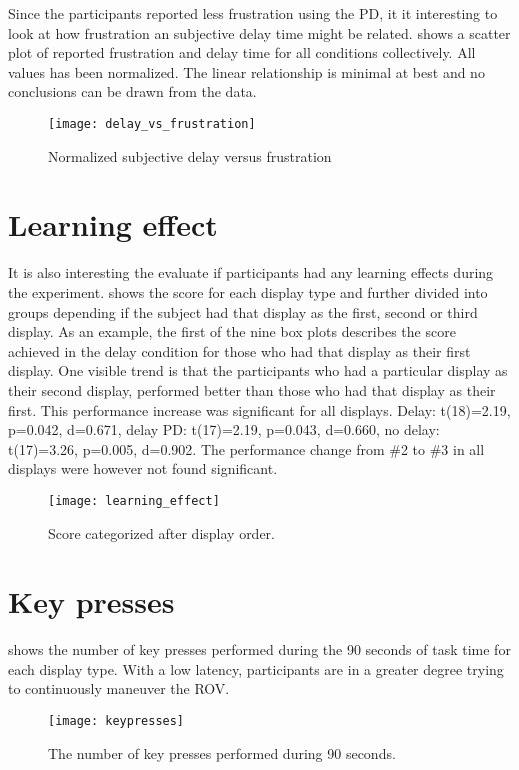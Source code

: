 Since the participants reported less frustration using the PD, it it interesting to look at how frustration an subjective delay time might be related.  shows a scatter plot of reported frustration and delay time for all conditions collectively. All values has been normalized. The linear relationship is minimal at best and no conclusions can be drawn from the data.

\begin{figure}[h!]
    \centering
    \texttt{[image: delay\_vs\_frustration]}
    \caption{Normalized subjective delay versus frustration}
    \label{delay_vs_frustration}
\end{figure}

\section{Learning effect}

It is also interesting the evaluate if participants had any learning effects during the experiment.  shows the score for each display type and further divided into groups depending if the subject had that display as the first, second or third display. As an example, the first of the nine box plots describes the score achieved in the delay condition for those who had that display as their first display. One visible trend is that the participants who had a particular display as their second display, performed better than those who had that display as their first. This performance increase was significant for all displays. Delay: t(18)=2.19, p=0.042, d=0.671, delay PD: t(17)=2.19, p=0.043, d=0.660, no delay: t(17)=3.26, p=0.005, d=0.902. The performance change from \#2 to \#3 in all displays were however not found significant.

\begin{figure}[h!]
    \centering
    \texttt{[image: learning\_effect]}
    \caption{Score categorized after display order.}
    \label{learning_effect}
\end{figure}

\section{Key presses}

 shows the number of key presses performed during the 90 seconds of task time for each display type. With a low latency, participants are in a greater degree trying to continuously maneuver the ROV.

\begin{figure}[h!]
    \centering
    \texttt{[image: keypresses]}
    \caption{The number of key presses performed during 90 seconds.}
    \label{keypresses}
\end{figure}
